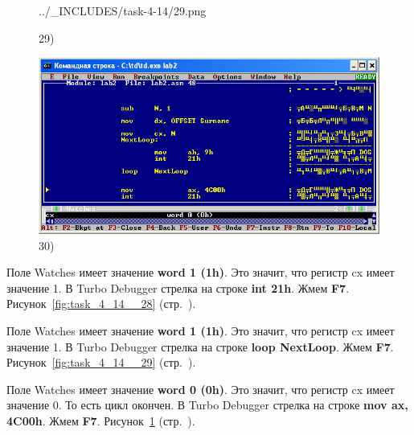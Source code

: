 \begin{figure}[!htp]
\begin {minipage}{0.32\textwidth}
            {../_INCLUDES/task-4-14/29.png}
        \caption{29) }
        \label{fig:task_4_14__29}
    \end{minipage}
    \begin {minipage}{0.32\textwidth}
        \centering
        \includegraphics[width=.99\linewidth]
            {../_INCLUDES/task-4-14/30.png}
        \caption{30) }
        \label{fig:task_4_14__30}
    \end{minipage}
\end{figure}

Поле Watches имеет значение \textbf{word 1 (1h)}.
Это значит, что регистр cx имеет значение 1.
В Turbo Debugger стрелка на строке \textbf{int 21h}.
Жмем \textbf{F7}.
Рисунок~\ref{fig:task_4_14__28} (стр.~\pageref{fig:task_4_14__28}).

Поле Watches имеет значение \textbf{word 1 (1h)}.
Это значит, что регистр cx имеет значение 1.
В Turbo Debugger стрелка на строке \textbf{loop NextLoop}.
Жмем \textbf{F7}.
Рисунок~\ref{fig:task_4_14__29} (стр.~\pageref{fig:task_4_14__29}).

Поле Watches имеет значение \textbf{word 0 (0h)}.
Это значит, что регистр cx имеет значение 0.
То есть цикл окончен.
В Turbo Debugger стрелка на строке \textbf{mov ax, 4C00h}. Жмем \textbf{F7}.
Рисунок~\ref{fig:task_4_14__30} (стр.~\pageref{fig:task_4_14__30}).

